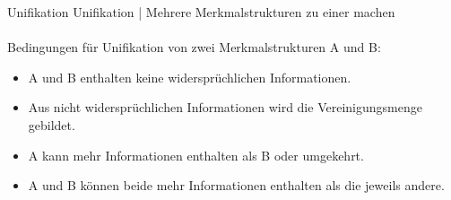 \begin{frame}
  {Unifikation}
  \onslide<+->
  \onslide<+->
  \alert{Unifikation} | Mehrere Merkmalstrukturen \alert{zu einer machen}\\
  \\
  \Viertelzeile
  \onslide<+->
  Bedingungen für Unifikation von zwei Merkmalstrukturen A und B:\\
  \begin{itemize}[<+->]
    \item A und B enthalten \alert{keine widersprüchlichen Informationen}.\\
      \Viertelzeile
      \onslide<+->
      \grau{%
        \scalebox{0.8}{\begin{avm}
          \[ cas & nom \]
        \end{avm}} \raisebox{-0.15\baselineskip}{und} %
        \scalebox{0.8}{\begin{avm}
          \[ cas & acc \]
        \end{avm}} \raisebox{-0.15\baselineskip}{unifizieren nicht.}}
      \Halbzeile
    \item Aus nicht widersprüchlichen Informationen wird die \alert{Vereinigungsmenge} gebildet.
    \item A kann mehr Informationen enthalten als B oder umgekehrt.\\
      \Viertelzeile
      \onslide<+->
      \grau{%
        \scalebox{0.8}{\begin{avm}
          \[ cas & nom \\ per & 3 \]
        \end{avm}} \raisebox{-0.5\baselineskip}{und} %
        \raisebox{-0.4\baselineskip}{\scalebox{0.8}{\begin{avm}
          \[ cas & nom \]
        \end{avm}}} \raisebox{-0.5\baselineskip}{unifizieren zu} %
        \scalebox{0.8}{\begin{avm}
          \[ cas & nom \\ per & 3 \]
        \end{avm}}}
      \Halbzeile
    \item A und B können beide mehr Informationen enthalten als die jeweils andere.\\
      \Viertelzeile
      \onslide<+->
      \grau{%
        \raisebox{-0.5\baselineskip}{\scalebox{0.8}{\begin{avm}
          \[ cas & nom \\ per & 3 \]

\end{avm}}}}
\end{itemize}
\end{frame}

